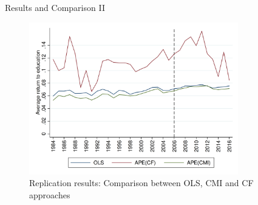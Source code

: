 \documentclass[10pt,ignorenonframetext,]{beamer}
\begin{document}
\begin{frame}{Results and Comparison II}
\protect\hypertarget{results-and-comparison-ii}{}

\begin{figure}
\centering
\includegraphics[width=\textwidth,height=2.60417in]{img/OLS_CMI_CF_Repli.png}
\caption{Replication results: Comparison between OLS, CMI and CF
approaches}
\end{figure}

\begingroup\fontsize{7}{9}\selectfont


\end{frame}
\end{document}
